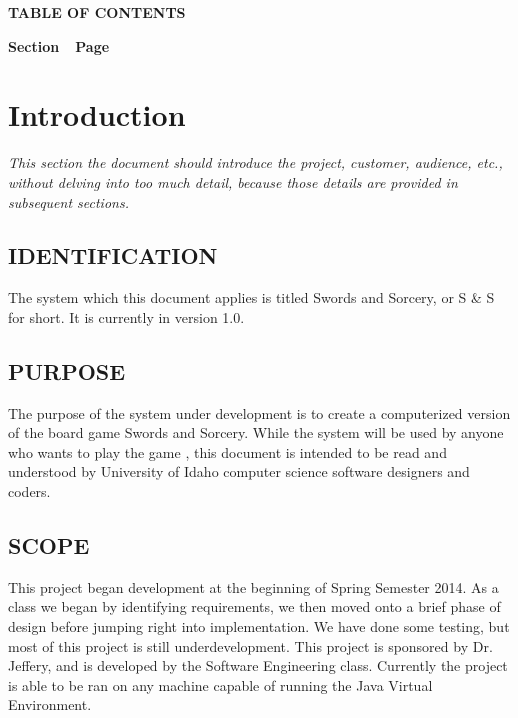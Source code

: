 \documentclass[twoside,letterpaper,pdftex]{article}
\begin{document}
{\centering{}\bfseries\color{black}
TABLE OF CONTENTS
\par}


\bigskip

{\bfseries\color{black}
Section\ \ Page}

\setcounter{tocdepth}{9}
\renewcommand\contentsname{}
\tableofcontents

\bigskip

\clearpage\clearpage\setcounter{page}{1}\pagestyle{Convertii}
\section[Introduction]{\rmfamily\bfseries Introduction}
\hypertarget{RefHeading15659017292}{}{
{\textit{
This section the document should introduce the project, customer,
audience, etc., without delving into too much detail, because those
details are provided in subsequent sections.}}}

\subsection[IDENTIFICATION]{\rmfamily\bfseries IDENTIFICATION}
\hypertarget{RefHeading15859017292}{}{\itshape
}

{
The system which this document applies is titled Swords and Sorcery, or S \& S for short. It is currently in version 1.0.}

\subsection[PURPOSE]{\rmfamily\bfseries PURPOSE}
\hypertarget{RefHeading16059017292}{}{\itshape
}

{
The purpose of the system under development is to
create a computerized version of the board game Swords and Sorcery. 
While the system will be used by anyone who wants to play the game
, this document is intended to be read and understood
by University of Idaho computer science software designers and coders.}

\subsection[SCOPE]{\rmfamily\bfseries SCOPE}
\hypertarget{RefHeading16259017292}{}{\itshape
}

{
This project began development at the beginning of Spring Semester 2014. As a class
we began by identifying requirements, we then moved onto a brief phase of design before
jumping right into implementation. We have done some testing, but most of this project
is still underdevelopment. This project is sponsored by Dr. Jeffery, and is developed by
the Software Engineering class. Currently the project is able to be ran on any machine
capable of running the Java Virtual Environment.}
\end{document}
